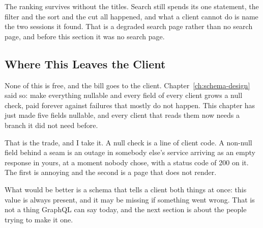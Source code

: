 %
The ranking survives without the titles. Search still spends its one statement,
the filter and the sort and the cut all happened, and what a client cannot do
is name the two sessions it found. That is a degraded search page rather than
no search page, and before this section it was no search page.

\subsection{Where This Leaves the Client}

%
None of this is free, and the bill goes to the client.
Chapter~\ref{ch:schema-design} said so: make everything nullable and every field
of every client grows a null check, paid forever against failures that mostly do
not happen. This chapter has just made five fields nullable, and every client
that reads them now needs a branch it did not need before.

%
That is the trade, and I take it. A null check is a line of client code. A
non-null field behind a seam is an outage in somebody else's service arriving
as an empty response in yours, at a moment nobody chose, with a status code of
200 on it. The first is annoying and the second is a page that does not render.

%
What would be better is a schema that tells a client both things at once: this
value is always present, and it may be missing if something went wrong. That is
not a thing GraphQL can say today, and the next section is about the people
trying to make it one.
%
